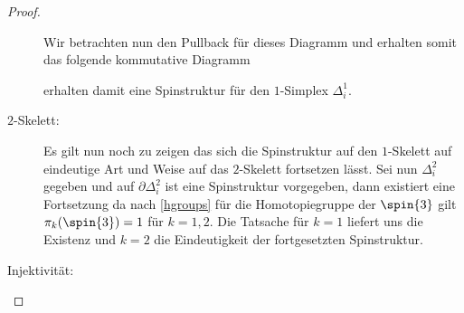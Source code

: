 \begin{Satz}
\begin{proof}
\begin{description}
		\begin{center}\end{center}
			Wir betrachten nun den Pullback für dieses Diagramm
			und erhalten somit das folgende kommutative Diagramm
		\begin{center}\end{center}
	 erhalten damit eine Spinstruktur für den $1$-Simplex
		$\Delta^1_i$. 
		\item[$2$-Skelett:] Es gilt nun noch zu zeigen das sich
		die Spinstruktur auf den $1$-Skelett auf eindeutige Art
		und Weise auf das $2$-Skelett fortsetzen lässt.
		Sei nun $\Delta^2_i$ gegeben und auf $\partial\Delta^2_i$
		ist eine Spinstruktur vorgegeben, dann existiert eine 
		Fortsetzung da nach \cref{hgroups} für die Homotopiegruppe
		der $\spin{3}$ gilt $\pi_k(\spin{3})=1$ für $k=1,2$.
		Die Tatsache für $k=1$ liefert uns die Existenz und $k=2$
		die Eindeutigkeit der fortgesetzten Spinstruktur.
		\item[Injektivität:] 
	\end{description}
\end{proof}
\end{Satz}




